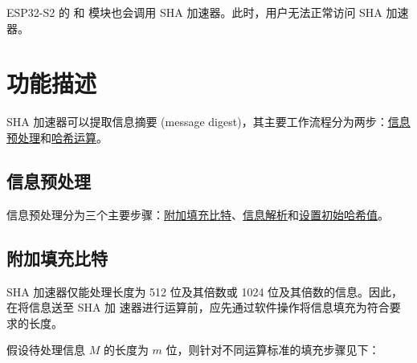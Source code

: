 \documentclass[main\_\_CN.tex]{subfiles}
\begin{document}
\begin{importantlisting}
\vspace{-0.5em}

    ESP32-S2 的  和  模块也会调用 SHA 加速器。此时，用户无法正常访问 SHA 加速器。
\end{importantlisting}

\section{功能描述}

SHA 加速器可以提取信息摘要 (message digest)，其主要工作流程分为两步：\hyperref[preprocessing]{信息预处理}和\hyperref[hashoperation]{哈希运算}。

\subsection{信息预处理}\label{preprocessing}

信息预处理分为三个主要步骤：\hyperref[textpadding]{附加填充比特}、\hyperref[parsingmessage]{信息解析}和\hyperref[initialhash]{设置初始哈希值}。

\subsection{附加填充比特}\label{textpadding}

SHA 加速器仅能处理长度为 512 位及其倍数或 1024 位及其倍数的信息。因此，在将信息送至 SHA 加
速器进行运算前，应先通过软件操作将信息填充为符合要求的长度。

假设待处理信息 \begin{math} M \end{math} 的长度为 \begin{math} m \end{math} 位，则针对不同运算标准的填充步骤见下：
\end{document}
